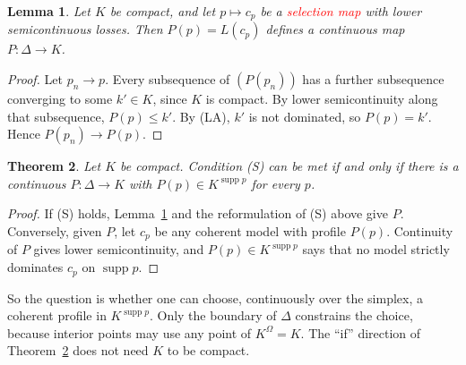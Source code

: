 \documentclass[11pt]{article}
\newtheorem{theorem}{Theorem}[section]
\newtheorem{lemma}[theorem]{Lemma}
\theoremstyle{definition}
\theoremstyle{remark}
\newcommand{\supp}{\operatorname{supp}}
\begin{document}
\begin{lemma}\label{lem:profcont}
Let $K$ be compact, and let $p\mapsto c_p$ be a \textcolor{red}{selection map} with lower semicontinuous losses. Then $P(p)=L(c_p)$ defines a continuous map $P:\Delta\to K$.
\end{lemma}
\begin{proof}
Let $p_n\to p$. Every subsequence of $(P(p_n))$ has a further subsequence converging to some $k'\in K$, since $K$ is compact. By lower semicontinuity along that subsequence, $P(p)\le k'$. By (LA), $k'$ is not dominated, so $P(p)=k'$. Hence $P(p_n)\to P(p)$.
\end{proof}

\begin{theorem}\label{thm:selection}
Let $K$ be compact. Condition (S) can be met if and only if there is a continuous $P:\Delta\to K$ with $P(p)\in K^{\supp p}$ for every $p$.
\end{theorem}
\begin{proof}
If (S) holds, Lemma~\ref{lem:profcont} and the reformulation of (S) above give $P$. Conversely, given $P$, let $c_p$ be any coherent model with profile $P(p)$. Continuity of $P$ gives lower semicontinuity, and $P(p)\in K^{\supp p}$ says that no model strictly dominates $c_p$ on $\supp p$.
\end{proof}
So the question is whether one can choose, continuously over the simplex, a coherent profile in $K^{\supp p}$. Only the boundary of $\Delta$ constrains the choice, because interior points may use any point of $K^\Omega=K$. The ``if'' direction of Theorem~\ref{thm:selection} does not need $K$ to be compact.
\end{document}
